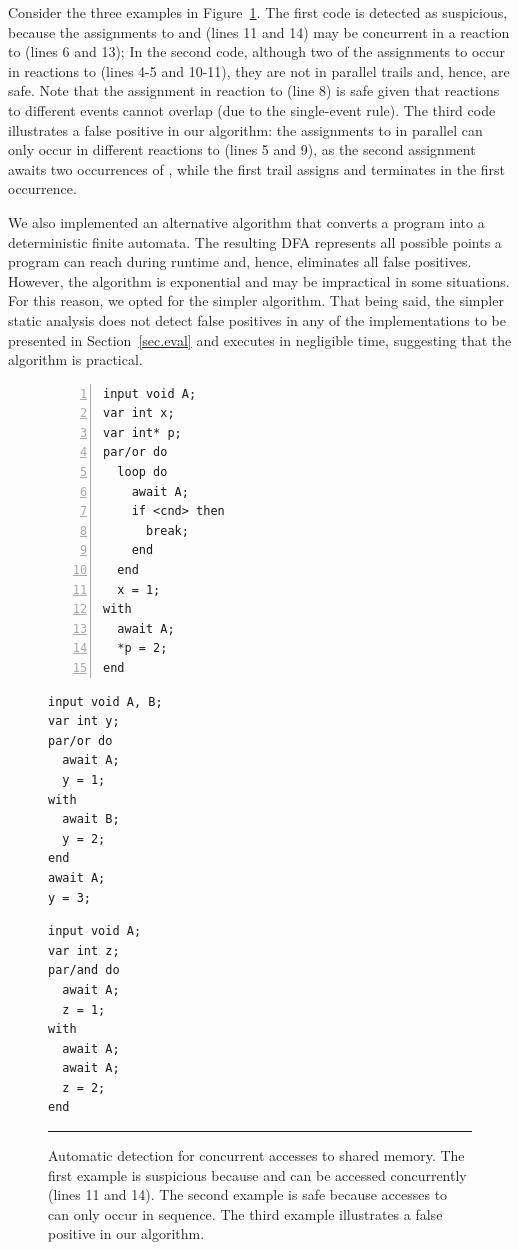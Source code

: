 Consider the three examples in Figure~\ref{lst.det}.
The first code is detected as suspicious, because the assignments to  
and  (lines 11 and 14) may be concurrent in a reaction to  
(lines 6 and 13);
%
In the second code, although two of the assignments to  occur in 
reactions to  (lines 4-5 and 10-11), they are not in parallel trails 
and, hence, are safe.
Note that the assignment in reaction to  (line 8) is safe given that 
reactions to different events cannot overlap (due to the single-event rule).
%
The third code illustrates a false positive in our algorithm: the assignments 
to  in parallel can only occur in different reactions to  
(lines 5 and 9), as the second assignment awaits two occurrences of , 
while the first trail assigns and terminates in the first occurrence.

We also implemented an alternative algorithm that converts a \CEU program into 
a deterministic finite automata.
The resulting DFA represents all possible points a program can reach during 
runtime and, hence, eliminates all false positives.
However, the algorithm is exponential and may be impractical in some 
situations.
%
For this reason, we opted for the simpler algorithm.
%
That being said, the simpler static analysis does not detect false positives in 
any of the
implementations to be presented in Section~\ref{sec.eval} and executes in 
negligible time, suggesting that the algorithm is practical.

\begin{figure}[t]
\begin{minipage}[t]{0.39\linewidth}
\begin{lstlisting}[numbers=left,xleftmargin=2em]
input void A;
var int x;
var int* p;
par/or do
  loop do
    await A;
    if <cnd> then
      break;
    end
  end
  x = 1;
with
  await A;
  *p = 2;
end

\end{lstlisting}
\end{minipage}
%
%
\begin{minipage}[t]{0.33\linewidth}
\begin{lstlisting}
input void A, B;
var int y;
par/or do
  await A;
  y = 1;
with
  await B;
  y = 2;
end
await A;
y = 3;

\end{lstlisting}
\end{minipage}
%
%
\begin{minipage}[t]{0.25\linewidth}
\begin{lstlisting}
input void A;
var int z;
par/and do
  await A;
  z = 1;
with
  await A;
  await A;
  z = 2;
end
\end{lstlisting}
\end{minipage}
%
\rule{14cm}{0.37pt}
\caption{ Automatic detection for concurrent accesses to shared memory. \newline
{\small %
The first example is suspicious because  and  can be accessed 
concurrently (lines 11 and 14).
The second example is safe because accesses to  can only occur in 
sequence.
The third example illustrates a false positive in our algorithm.
}%
\label{lst.det}
}
\end{figure}

